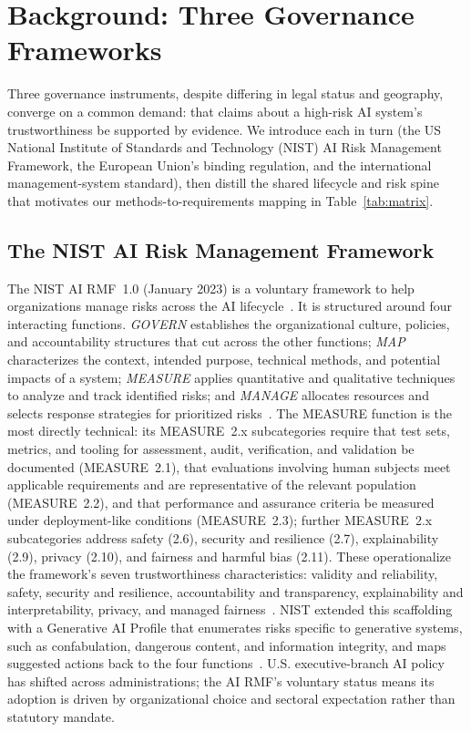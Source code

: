\section{Background: Three Governance Frameworks}
\label{sec:background}

Three governance instruments, despite differing in legal status and geography, converge on a common demand: that claims about a high-risk AI system's trustworthiness be supported by evidence. We introduce each in turn (the US National Institute of Standards and Technology (NIST) AI Risk Management Framework, the European Union's binding regulation, and the international management-system standard), then distill the shared lifecycle and risk spine that motivates our methods-to-requirements mapping in Table~\ref{tab:matrix}.

\subsection{The NIST AI Risk Management Framework}
\label{subsec:nist}
The NIST AI RMF~1.0 (January 2023) is a voluntary framework to help organizations manage risks across the AI lifecycle~\cite{nist2023airmf}. It is structured around four interacting functions. \textit{GOVERN} establishes the organizational culture, policies, and accountability structures that cut across the other functions; \textit{MAP} characterizes the context, intended purpose, technical methods, and potential impacts of a system; \textit{MEASURE} applies quantitative and qualitative techniques to analyze and track identified risks; and \textit{MANAGE} allocates resources and selects response strategies for prioritized risks~\cite{nist2023airmf}. The MEASURE function is the most directly technical: its MEASURE~2.x subcategories require that test sets, metrics, and tooling for assessment, audit, verification, and validation be documented (MEASURE~2.1), that evaluations involving human subjects meet applicable requirements and are representative of the relevant population (MEASURE~2.2), and that performance and assurance criteria be measured under deployment-like conditions (MEASURE~2.3); further MEASURE~2.x subcategories address safety (2.6), security and resilience (2.7), explainability (2.9), privacy (2.10), and fairness and harmful bias (2.11). These operationalize the framework's seven trustworthiness characteristics: validity and reliability, safety, security and resilience, accountability and transparency, explainability and interpretability, privacy, and managed fairness~\cite{nist2023airmf}. NIST extended this scaffolding with a Generative AI Profile that enumerates risks specific to generative systems, such as confabulation, dangerous content, and information integrity, and maps suggested actions back to the four functions~\cite{nist2024genai}. U.S. executive-branch AI policy has shifted across administrations; the AI RMF's voluntary status means its adoption is driven by organizational choice and sectoral expectation rather than statutory mandate.

